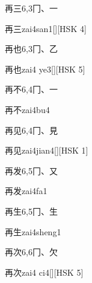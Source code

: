 \begin{entry}{再三}{6,3}{⼌、⼀}
  \begin{phonetics}{再三}{zai4san1}[][HSK 4]
  \end{phonetics}
\end{entry}

\begin{entry}{再也}{6,3}{⼌、⼄}
  \begin{phonetics}{再也}{zai4 ye3}[][HSK 5]
  \end{phonetics}
\end{entry}

\begin{entry}{再不}{6,4}{⼌、⼀}
  \begin{phonetics}{再不}{zai4bu4}
  \end{phonetics}
\end{entry}

\begin{entry}{再见}{6,4}{⼌、⾒}
  \begin{phonetics}{再见}{zai4jian4}[][HSK 1]
  \end{phonetics}
\end{entry}

\begin{entry}{再发}{6,5}{⼌、⼜}
  \begin{phonetics}{再发}{zai4fa1}
  \end{phonetics}
\end{entry}

\begin{entry}{再生}{6,5}{⼌、⽣}
  \begin{phonetics}{再生}{zai4sheng1}
  \end{phonetics}
\end{entry}

\begin{entry}{再次}{6,6}{⼌、⽋}
  \begin{phonetics}{再次}{zai4 ci4}[][HSK 5]
  \end{phonetics}
\end{entry}

